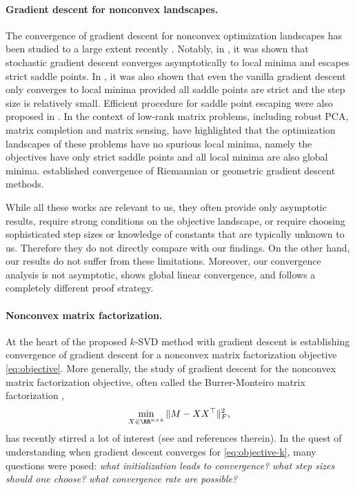 \paragraph{Gradient descent for nonconvex landscapes.}
The convergence of gradient descent for nonconvex optimization landscapes has been studied to a large extent recently \cite{baldi1989neural, zhang2016riemannian, ge2015escaping, lee2016gradient, ge2016matrix, ge2017no, jin2017escape, du2018algorithmic}. Notably, in \cite{ge2015escaping}, it was shown that stochastic gradient descent converges asymptotically to local minima and escapes strict saddle points. In \cite{lee2016gradient}, it was also shown that even the vanilla gradient descent only converges to local minima provided all saddle points are strict and the step size is relatively small. Efficient procedure for saddle point escaping were also proposed in \cite{jin2017escape}. In the context of low-rank matrix problems, including robust PCA, matrix completion and matrix sensing, \cite{ge2016matrix,ge2017no} have highlighted that the optimization landscapes of these problems have no spurious local minima, namely the objectives have only strict saddle points and all local minima are also global minima. \cite{balzano2010online, zhang2016riemannian} established convergence of Riemannian or geometric gradient descent methods.  

While all these works are relevant to us, they often provide only asymptotic results, require strong conditions on the objective landscape, or require choosing sophisticated step sizes or knowledge of constants that are typically unknown to us. Therefore they do not directly compare with our findings. On the other hand, our results do not suffer from these limitations. Moreover, our convergence analysis is not asymptotic, shows global linear convergence, and follows a completely different proof strategy.  


\paragraph{Nonconvex matrix factorization.} At the heart of the proposed $k$-SVD method with gradient descent is establishing convergence of gradient descent for a nonconvex matrix factorization objective \eqref{eq:objective}. More generally, the study of gradient descent for  the nonconvex matrix factorization objective, often called the Burrer-Monteiro matrix factorization \cite{burer2003nonlinear},      
\begin{align}\label{eq:objective-k}
        \min_{X \in \RR^{n \times k}}  \Vert M - XX^\top \Vert_F^2,  
\end{align} 
has recently stirred a lot of interest (see \cite{candes2015phase, de2015global,jain2017global,chi2019nonconvex, chen2019gradient, tong2021accelerating, stoger2021small, zhang2023preconditioned, xu2023power, jia2024preconditioning, li2024crucial} and references therein). In the quest of understanding when gradient descent converges for \eqref{eq:objective-k}, many questions were posed: \emph{what initialization leads to convergence?} \emph{what step sizes should one choose?} \emph{what convergence rate are possible?} 

